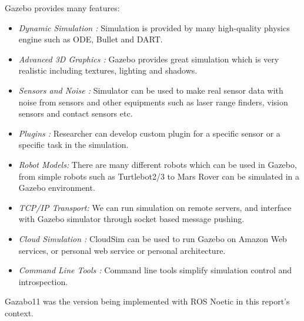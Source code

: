 Gazebo provides many features:
\begin{itemize}
    \item \textit{Dynamic Simulation : } Simulation is provided by many high-quality physics engine such as ODE, Bullet and DART.
    \item \textit{Advanced 3D Graphics : } Gazebo provides great simulation which is very realistic including textures, lighting and shadows.
    \item \textit{Sensors and Noise :} Simulator can be used to make real sensor data with noise from sensors and other equipments such as laser range finders, vision sensors and contact sensors etc.
    \item \textit{Plugins :} Researcher can develop custom plugin for a specific sensor or a specific task in the simulation.
    \item \textit{Robot Models: } There are many different robots which can be used in Gazebo, from simple robots such as Turtlebot2/3 to Mars Rover can be simulated in a Gazebo environment.
    \item \textit{TCP/IP Transport: } We can run simulation on remote servers, and interface with Gazebo simulator through socket based message pushing.
    \item \textit{Cloud Simulation :} CloudSim can be used to run Gazebo on Amazon Web services, or personal web service or personal architecture.
    \item \textit{Command Line Tools : } Command line tools simplify simulation control and introspection.
\end{itemize}
Gazabo11 was the version being implemented with ROS Noetic in this report's context.

